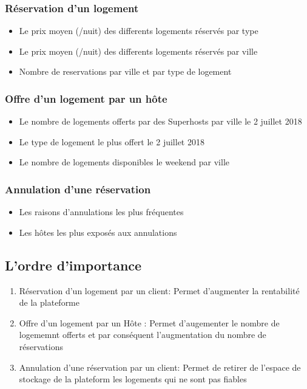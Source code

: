 \documentclass[11pt]{article}
\begin{document}
\subsubsection*{Réservation d'un logement}
\begin{itemize}
	\item Le prix moyen (/nuit) des differents logements réservés par type
	\item Le prix moyen (/nuit) des differents logements réservés par ville
	\item Nombre de reservations par ville et par type de logement
\end{itemize}
\subsubsection*{Offre d'un logement par un hôte}
\begin{itemize}
	\item Le nombre de logements offerts par des \og Superhosts \fg{} par ville le 2 juillet 2018
	\item Le type de logement le plus offert le 2 juillet 2018
	\item Le nombre de logements disponibles le weekend par ville
\end{itemize}
\subsubsection*{Annulation d'une réservation}
\begin{itemize}
	\item Les raisons d'annulations les plus fréquentes
	\item Les hôtes les plus exposés aux annulations
\end{itemize}
\subsection{L'ordre d'importance}
\begin{enumerate}
	\item Réservation d'un logement par un client: Permet d'augmenter la rentabilité de la plateforme
	\item Offre d'un logement par un Hôte : Permet d'augementer le nombre de logememnt offerts et par conséquent l'augmentation du nombre de réservations
	\item Annulation d'une réservation par un client: Permet de retirer de l'espace de stockage de la plateform les logements qui ne sont pas fiables
\end{enumerate}
\end{document}
